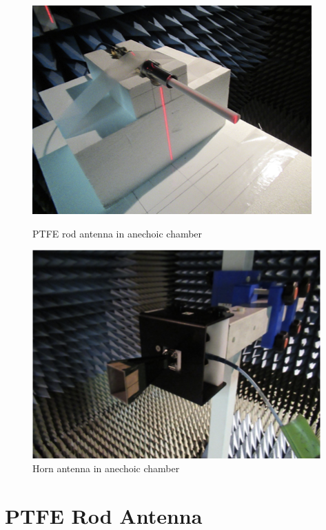\documentclass[a4paper,12pt]{report}
\begin{document}
\begin{figure}
  \centering
  \begin{minipage}{0.45\textwidth}
    \centering
    \includegraphics[clip, keepaspectratio, width=0.9\linewidth]{img/ptfe_rod_antenna_anechoic_chamber.png}
    \caption{PTFE rod antenna in anechoic chamber}
    \label{fig:ptfe_rod_antenna_anechoic_chamber} 
  \end{minipage}\hfill
  \begin{minipage}{0.45\textwidth}
    \centering
    \includegraphics[clip, keepaspectratio, width=0.9\linewidth]{img/horn_antenna_anechoic_chamber.png}
    \caption{Horn antenna in anechoic chamber}
    \label{img:horn_antenna_anechoic_chamber}
  \end{minipage}\hfill
\end{figure}

\chapter{PTFE Rod Antenna}
\end{document}
